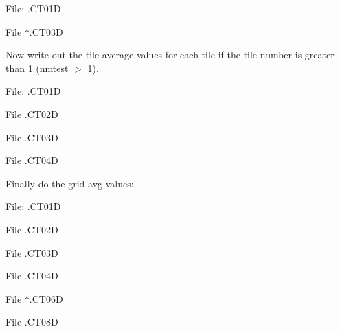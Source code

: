 File\+: .C\+T01\+D

File $\ast$.C\+T03\+D

Now write out the tile average values for each tile if the tile number is greater than 1 (nmtest $>$ 1).

File\+: .C\+T01\+D

File .C\+T02\+D

File .C\+T03\+D

File .C\+T04\+D

Finally do the grid avg values\+:

File\+: .C\+T01\+D

File .C\+T02\+D

File .C\+T03\+D

File .C\+T04\+D

File $\ast$.C\+T06\+D

File .C\+T08\+D 